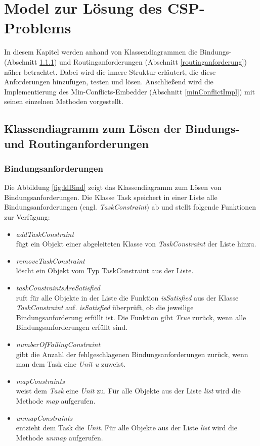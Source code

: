 \chapter{Model zur Lösung des CSP-Problems}\label{model}

In diesem Kapitel werden anhand von Klassendiagrammen die Bindungs- (Abschnitt \ref{bindunganforderung}) und Routinganforderungen (Abschnitt \ref{routinganforderung}) näher betrachtet. Dabei wird die innere Struktur erläutert, die diese Anforderungen hinzufügen, testen und lösen. Anschließend wird die Implementierung des Min-Conflicts-Embedder (Abschnitt \ref{minConflictImpl}) mit seinen einzelnen Methoden vorgestellt.

\section{Klassendiagramm zum Lösen der Bindungs- und Routinganforderungen}

\subsection{Bindungsanforderungen}\label{bindunganforderung}

Die Abbildung \ref{fig:klBind} zeigt das Klassendiagramm zum Lösen von Bindungsanforderungen. Die Klasse Task speichert in einer Liste alle Bindungsanforderungen (engl. \textit{TaskConstraint}) ab und stellt folgende Funktionen zur Verfügung:

\begin{itemize}
\item \textit{addTaskConstraint}\\
fügt ein Objekt einer abgeleiteten Klasse von \textit{TaskConstraint} der Liste hinzu. 
\item \textit{removeTaskConstraint}\\
löscht ein Objekt vom Typ TaskConstraint aus der Liste.
\item \textit{taskConstraintsAreSatisfied}\\
ruft für alle Objekte in der Liste die Funktion \textit{isSatisfied} aus der Klasse \textit{TaskConstraint} auf. \textit{isSatisfied} überprüft, ob die jeweilige Bindungsanforderung erfüllt ist. Die Funktion gibt \textit{True} zurück, wenn alle Bindungsanforderungen erfüllt sind.%
\item \textit{numberOfFailingConstraint}\\
gibt die Anzahl der fehlgeschlagenen Bindungsanforderungen zurück, wenn man dem Task eine \textit{Unit u} zuweist. 
\item \textit{mapConstraints}\\
weist dem \textit{Task} eine \textit{Unit} zu. Für alle Objekte aus der Liste \textit{list} wird die Methode \textit{map} aufgerufen.
\item \textit{unmapConstraints}\\
entzieht dem Task die \textit{Unit}. Für alle Objekte aus der Liste \textit{list} wird die Methode \textit{unmap} aufgerufen.
\end{itemize}

